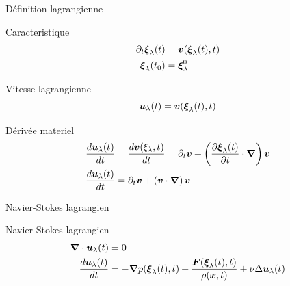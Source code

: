 \begin{frame}[<+->]{Définition lagrangienne}
 \begin{block}{Caracteristique}
\begin{align*}
 \partial_t {\boldsymbol {\xi}}_{\lambda}(t)&={\boldsymbol {v}}({\boldsymbol {\xi}}_{\lambda}(t),t)\\
 {\boldsymbol {\xi}}_{\lambda}(t_0)&={\boldsymbol {\xi}}^{0}_{\lambda}
\end{align*}
\end{block}

\begin{block}{Vitesse lagrangienne}
\begin{equation*}
 {\boldsymbol {u}}_{\lambda}(t)={\boldsymbol {v}}({\boldsymbol {\xi}}_{\lambda}(t),t)
\end{equation*}
\end{block}

\begin{block}{Dérivée materiel}
\begin{align*}
\frac{d {\boldsymbol {u}}_{\lambda}(t)}{d t}&=\frac{d {\boldsymbol {v}}(\xi_{\lambda},t)}{d t}=\partial_t {\boldsymbol {v}}+\left(\frac{\partial {\boldsymbol {\xi}}_{\lambda}(t)}{\partial t}\cdot{\boldsymbol {\nabla}}\right){\boldsymbol {v}}\\
\frac{d {\boldsymbol {u}}_{\lambda}(t)}{d t}&=\partial_t {\boldsymbol {v}}+\left({\boldsymbol {v}} \cdot{\boldsymbol {\nabla}}\right){\boldsymbol {v}}
\end{align*}
 \end{block}

\end{frame}
\begin{frame}{Navier-Stokes lagrangien}
 \begin{block}{Navier-Stokes lagrangien}
 \begin{align*}
{\boldsymbol {\nabla}} \cdot {\boldsymbol {u}}_{\lambda}(t)&=0\\
\frac{d {\boldsymbol {u}}_{\lambda}(t)}{d t}&=-{\boldsymbol {\nabla}} p({\boldsymbol {\xi}}_{\lambda}(t),t)+\frac{{\boldsymbol {F}}({\boldsymbol {\xi}}_{\lambda}(t),t)}{\rho({\boldsymbol {x}},t)}+\nu \Delta {\boldsymbol {u}}_{\lambda}(t)
 \end{align*}
 \end{block}

\end{frame}


